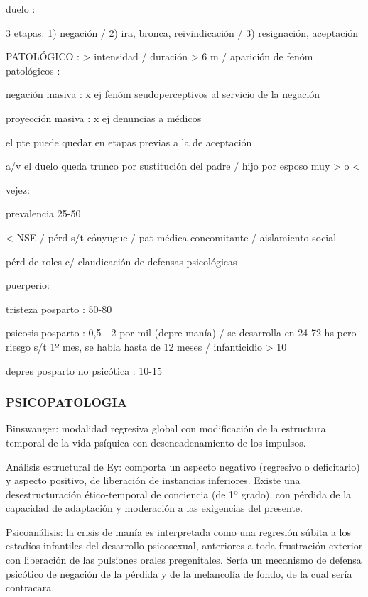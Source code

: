 duelo :

3 etapas: 1) negación / 2) ira, bronca, reivindicación / 3) resignación, aceptación

PATOLÓGICO : > intensidad / duración > 6 m / aparición de fenóm patológicos :

negación masiva : x ej fenóm seudoperceptivos al servicio de la negación

proyección masiva : x ej denuncias a médicos

el pte puede quedar en etapas previas a la de aceptación

a/v el duelo queda trunco por sustitución del padre / hijo por esposo muy > o <

vejez:

prevalencia 25-50%

< NSE / pérd s/t cónyugue / pat médica concomitante / aislamiento social

pérd de roles c/ claudicación de defensas psicológicas

puerperio:

tristeza posparto : 50-80%

psicosis posparto : 0,5 - 2 por mil (depre-manía) / se desarrolla en 24-72 hs pero riesgo s/t 1º mes, se habla hasta de 12 meses / infanticidio > 10%

depres posparto no psicótica : 10-15%

\subsubsection*{PSICOPATOLOGIA}

Binswanger: modalidad regresiva global con modificación de la estructura temporal de la vida psíquica con desencadenamiento de los impulsos.

Análisis estructural de Ey: comporta un aspecto negativo (regresivo o deficitario) y aspecto positivo, de liberación de instancias inferiores. Existe una desestructuración ético-temporal de conciencia (de 1º grado), con pérdida de la capacidad de adaptación y moderación a las exigencias del presente.

Psicoanálisis: la crisis de manía es interpretada como una regresión súbita a los estadíos infantiles del desarrollo psicosexual, anteriores a toda frustración exterior con liberación de las pulsiones orales pregenitales. Sería un mecanismo de defensa psicótico de negación de la pérdida y de la melancolía de fondo, de la cual sería contracara.

